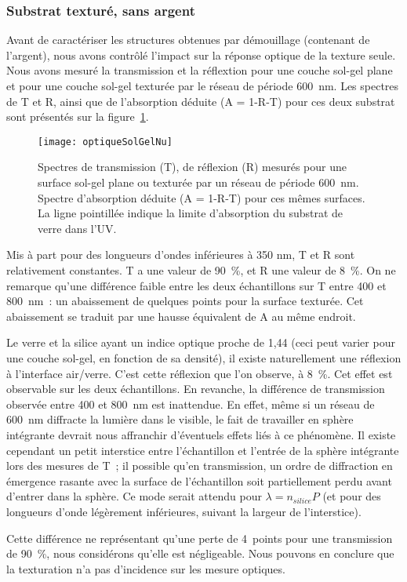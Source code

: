 	\subsubsection{Substrat texturé, sans argent}
Avant de caractériser les structures obtenues par démouillage (contenant de l'argent), nous avons contrôlé l’impact sur la réponse optique de la texture seule. Nous avons mesuré la transmission et la réflextion pour une couche sol-gel plane et pour une couche sol-gel texturée par le réseau de période 600~nm. Les spectres de T et R, ainsi que de l’absorption déduite (A = 1-R-T) pour ces deux substrat sont présentés sur la figure~\ref{optiqueSolGelNu}.\par 
\begin{figure}[!htb]
\centering
\texttt{[image: optiqueSolGelNu]}
\caption{Spectres de transmission (T), de réflexion (R) mesurés pour une surface sol-gel plane ou texturée par un réseau de période 600~nm. Spectre d’absorption déduite (A = 1-R-T) pour ces mêmes surfaces. La ligne pointillée indique la limite d’absorption du substrat de verre dans l’UV.}
\label{optiqueSolGelNu}
\end{figure}
Mis à part pour des longueurs d’ondes inférieures à 350 nm, T et R sont relativement constantes. T a une valeur de 90~\%, et R une valeur de 8~\%. On ne remarque qu’une différence faible entre les deux échantillons sur T entre 400 et 800~nm~: un abaissement de quelques points pour la surface texturée. Cet abaissement se traduit par une hausse équivalent de A au même endroit.\par 
Le verre et la silice ayant un indice optique proche de 1,44 (ceci peut varier pour une couche sol-gel, en fonction de sa densité), il existe naturellement une réflexion à l'interface air/verre. C'est cette réflexion que l'on observe, à 8~\%. Cet effet est observable sur les deux échantillons. En revanche, la différence de transmission observée entre 400 et 800~nm est inattendue. En effet, même si un réseau de 600~nm diffracte la lumière dans le visible, le fait de travailler en sphère intégrante devrait nous affranchir d'éventuels effets liés à ce phénomène. Il existe cependant un petit interstice entre l'échantillon et l'entrée de la sphère intégrante lors des mesures de T~; il possible qu'en transmission, un ordre de diffraction en émergence rasante avec la surface de l'échantillon soit partiellement perdu avant d'entrer dans la sphère. Ce mode serait attendu pour $\lambda = n_{silice}P$ (et pour des longueurs d'onde légèrement inférieures, suivant la largeur de l'interstice).\par 
Cette différence ne représentant qu'une perte de 4~points pour une transmission de 90~\%, nous considérons qu'elle est négligeable. Nous pouvons en conclure que la texturation n'a pas d'incidence sur les mesure optiques.\par 

